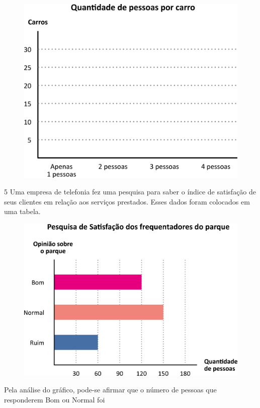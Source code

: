 \begin{figure}[htpb!]
\centering
\includegraphics[width=\textwidth]{./media/image81.png}
\end{figure}

\num{5} Uma empresa de telefonia fez uma pesquisa para saber o índice de
satisfação de seus clientes em relação aos serviços prestados. Esses dados foram
colocados em uma tabela.

\begin{figure}[htpb!]
\centering
\includegraphics[width=\textwidth]{./media/image82.png}
\end{figure}

Pela análise do gráfico, pode-se afirmar que o número de pessoas que
responderem Bom ou Normal foi

